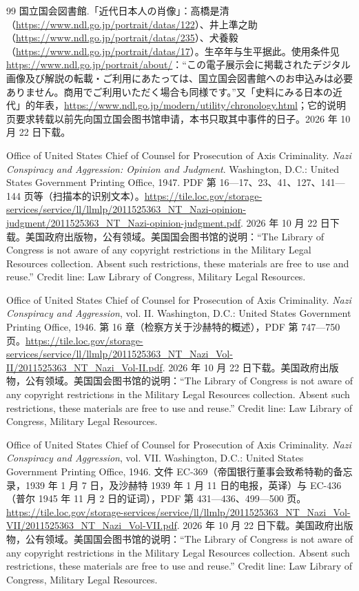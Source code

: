 \begin{thebibliography}{99}
 国立国会図書館.「近代日本人の肖像」：高橋是清（\url{https://www.ndl.go.jp/portrait/datas/122}）、井上準之助（\url{https://www.ndl.go.jp/portrait/datas/235}）、犬養毅（\url{https://www.ndl.go.jp/portrait/datas/17}）。生卒年与生平据此。使用条件见\url{https://www.ndl.go.jp/portrait/about/}：“この電子展示会に掲載されたデジタル画像及び解説の転載・ご利用にあたっては、国立国会図書館へのお申込みは必要ありません。商用でご利用いただく場合も同様です。”又「史料にみる日本の近代」的年表，\url{https://www.ndl.go.jp/modern/utility/chronology.html}；它的说明页要求转载以前先向国立国会图书馆申请，本书只取其中事件的日子。2026 年 10 月 22 日下载。

 Office of United States Chief of Counsel for Prosecution of Axis Criminality. \emph{Nazi Conspiracy and Aggression: Opinion and Judgment}. Washington, D.C.: United States Government Printing Office, 1947. PDF 第 16—17、23、41、127、141—144 页等（扫描本的识别文本）。\url{https://tile.loc.gov/storage-services/service/ll/llmlp/2011525363_NT_Nazi-opinion-judgment/2011525363_NT_Nazi-opinion-judgment.pdf}. 2026 年 10 月 22 日下载。美国政府出版物，公有领域。美国国会图书馆的说明：“The Library of Congress is not aware of any copyright restrictions in the Military Legal Resources collection. Absent such restrictions, these materials are free to use and reuse.” Credit line: Law Library of Congress, Military Legal Resources.

 Office of United States Chief of Counsel for Prosecution of Axis Criminality. \emph{Nazi Conspiracy and Aggression}, vol. II. Washington, D.C.: United States Government Printing Office, 1946. 第 16 章（检察方关于沙赫特的概述），PDF 第 747—750 页。\url{https://tile.loc.gov/storage-services/service/ll/llmlp/2011525363_NT_Nazi_Vol-II/2011525363_NT_Nazi_Vol-II.pdf}. 2026 年 10 月 22 日下载。美国政府出版物，公有领域。美国国会图书馆的说明：“The Library of Congress is not aware of any copyright restrictions in the Military Legal Resources collection. Absent such restrictions, these materials are free to use and reuse.” Credit line: Law Library of Congress, Military Legal Resources.

 Office of United States Chief of Counsel for Prosecution of Axis Criminality. \emph{Nazi Conspiracy and Aggression}, vol. VII. Washington, D.C.: United States Government Printing Office, 1946. 文件 EC-369（帝国银行董事会致希特勒的备忘录，1939 年 1 月 7 日，及沙赫特 1939 年 1 月 11 日的电报，英译）与 EC-436（普尔 1945 年 11 月 2 日的证词），PDF 第 431—436、499—500 页。\url{https://tile.loc.gov/storage-services/service/ll/llmlp/2011525363_NT_Nazi_Vol-VII/2011525363_NT_Nazi_Vol-VII.pdf}. 2026 年 10 月 22 日下载。美国政府出版物，公有领域。美国国会图书馆的说明：“The Library of Congress is not aware of any copyright restrictions in the Military Legal Resources collection. Absent such restrictions, these materials are free to use and reuse.” Credit line: Law Library of Congress, Military Legal Resources.


\end{thebibliography}
